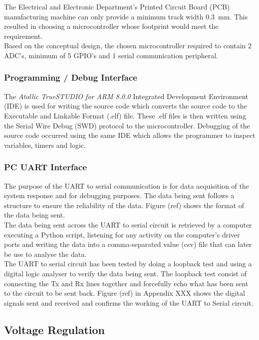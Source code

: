 The Electrical and Electronic Department's Printed Circuit Board (PCB) manufacturing machine can only provide a  minimum track width \SI{0.3}{mm}. This resulted in choosing a microcontroller whose footprint would meet the requirement.\\

Based on the conceptual design, the chosen microcontroller required to contain 2 ADC's, minimum of 5 GPIO's and 1 serial communication peripheral.

\subsubsection{Programming / Debug Interface}
The \textit{Atollic TrueSTUDIO for ARM 8.0.0} Integrated Development Environment (IDE) is used for writing the source code which converts the source code to the Executable and Linkable Format (.elf) file. These .elf files is then written using the Serial Wire Debug (SWD) protocol to the microcontroller. Debugging of the source code occurred using the same IDE which allows the programmer to inspect variables, timers and logic.

\subsubsection{PC UART Interface }

The purpose of the UART to serial communication is for data acquisition of the system response and for debugging purposes. The data being sent follows a structure to ensure the reliability of the data. Figure (ref) shows the format of the data being sent.\\

The data being sent across the UART to serial circuit is retrieved by a computer executing a Python script, listening for any activity on the computer's driver ports and writing the data into a comma-separated value (csv) file that can later be use to analyse the data.\\

The UART to serial circuit has been tested by doing a loopback test and using a digital logic analyser to verify the data being sent. The loopback test consist of connecting the Tx and Rx lines together and forcefully echo what has been sent to the circuit to be sent back. Figure (ref) in Appendix XXX shows the digital signals sent and received and confirms the working of the UART to Serial circuit. 

\subsection{Voltage Regulation}

